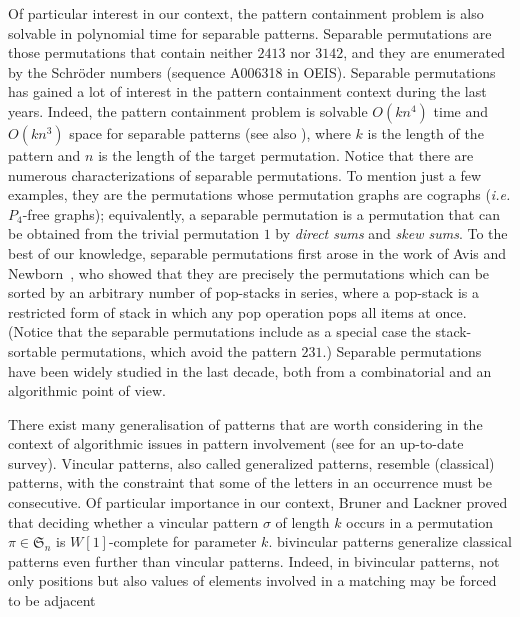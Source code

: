 \documentclass[a4paper]{llncs}
\newcounter{num}
\begin{document}
	Of particular interest in our context,
	the pattern containment problem is also solvable in
	polynomial time for separable patterns.
	Separable permutations are those permutations that contain neither
	$2413$ nor $3142$, and they are enumerated by the Schröder numbers
	(sequence A006318 in OEIS).
	Separable permutations has gained a lot of interest in the pattern containment
	context during the last years.
	Indeed, the pattern containment problem is solvable $O(kn^4)$ time and
	$O(kn^3)$ space for separable patterns \cite{Ibarra:1997}
	(see also \cite{Bose:Buss:Lubiw:1998}),
	where $k$ is the length of the pattern and $n$ is the length of the
	target permutation.
	Notice that there are numerous characterizations of separable permutations.
	To mention just a few examples,
	they are the permutations whose permutation graphs are cographs
	(\emph{i.e.} $P_4$-free graphs);
	equivalently, a separable permutation is a permutation that can be obtained
	from the trivial permutation $1$ by \emph{direct sums} and \emph{skew sums}.
	To the best of our knowledge,
	separable permutations first arose in the work of
	Avis and Newborn~\cite{Avis:Newborn:1981},
	who showed that they are precisely the permutations which can be sorted by an
	arbitrary number of pop-stacks in series,
	where a pop-stack is a restricted form of stack in which any pop operation
	pops all items at once.
	(Notice that the separable permutations include as a special case the
	stack-sortable permutations, which avoid the pattern $231$.)
	Separable permutations
	have been widely studied in the last decade, both from a combinatorial
	\cite{West:1995} and an algorithmic
	\cite{Ibarra:1997,Bose:Buss:Lubiw:1998,Rossin:Bouvel:06,Bouvel:Rossin:Vialette:CPM:2007} point
	of view.

	There exist many generalisation of patterns that are worth considering
	in the context of algorithmic issues in pattern involvement
	(see \cite{Kitaev:book:2011} for an up-to-date survey).
	Vincular patterns, also called generalized patterns,
	resemble (classical) patterns, with the constraint that some of the letters in
	an occurrence must be consecutive.
	Of particular importance in our context,
	Bruner and Lackner \cite{Bruner:Lackner:SWAT:2012}
	proved that deciding whether a vincular pattern
	$\sigma$ of length $k$ occurs in a permutation
	$\pi \in \mathfrak{S}_n$ is $W[1]$-complete for
	parameter $k$.
	bivincular patterns generalize classical patterns even further than vincular
	patterns. Indeed, in bivincular patterns, not only positions but also values
	of elements involved in a matching may be forced to be adjacent
\end{document}
